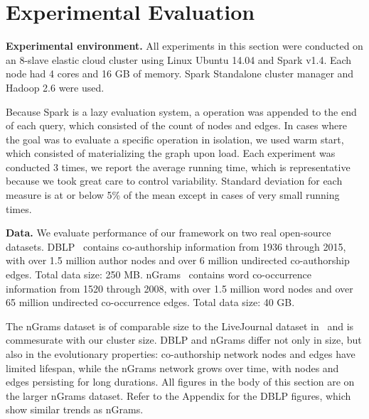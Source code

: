 \section{Experimental Evaluation}
\label{sec:exp}

{\bf Experimental environment.} All experiments in this section were
conducted on an 8-slave elastic cloud cluster using Linux Ubuntu 14.04
and Spark v1.4.  Each node had 4 cores and 16 GB of memory.  Spark
Standalone cluster manager and Hadoop 2.6 were used.

Because Spark is a lazy evaluation system, a 
operation was appended to the end of each query, which consisted of
the count of nodes and edges.  In cases where the goal was to evaluate
a specific operation in isolation, we used warm start, which consisted
of materializing the graph upon load.  Each experiment was conducted 3
times, we report the average running time, which is representative
because we took great care to control variability.  Standard deviation
for each measure is at or below 5\% of the mean except in cases of
very small running times.

{\bf Data.}  We evaluate performance of our framework on two real
open-source datasets.
DBLP~\cite{dblp} contains co-authorship information from 1936 through
2015, with over 1.5 million author nodes and over 6 million undirected
co-authorship edges.  Total data size: 250 MB.
%
nGrams~\cite{nGrams} contains word co-occurrence information from 1520
through 2008, with over 1.5 million word nodes and over 65 million
undirected co-occurrence edges.  Total data size: 40 GB.  


The nGrams dataset is of comparable size to the LiveJournal dataset
in~\cite{Xin2013} and is commesurate with our cluster size.  DBLP and
nGrams differ not only in size, but also in the evolutionary
properties: co-authorship network nodes and edges have limited
lifespan, while the nGrams network grows over time, with nodes and
edges persisting for long durations.  All figures in the body of this
section are on the larger nGrams dataset.  Refer to the Appendix for
the DBLP figures, which show similar trends as nGrams.

